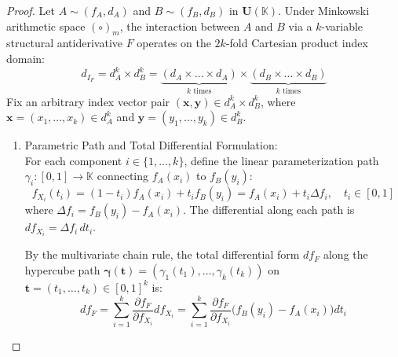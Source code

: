 \documentclass[a4paper,12pt,twoside]{memoir}
\begin{document}
	\begin{proof}
		Let $A \sim (f_A, d_A)$ and $B \sim (f_B, d_B)$ in $\mathbf{U}(\mathbb{K})$. Under Minkowski arithmetic space $(\circ)_m$, the interaction between $A$ and $B$ via a $k$-variable structural antiderivative $F$ operates on the $2k$-fold Cartesian product index domain:
		\[
		d_{I_F} = d_A^k \times d_B^k = \underbrace{(d_A \times \dots \times d_A)}_{k \text{ times}} \times \underbrace{(d_B \times \dots \times d_B)}_{k \text{ times}}
		\]
		Fix an arbitrary index vector pair $(\mathbf{x}, \mathbf{y}) \in d_A^k \times d_B^k$, where $\mathbf{x} = (x_1, \dots, x_k) \in d_A^k$ and $\mathbf{y} = (y_1, \dots, y_k) \in d_B^k$.
		
		\begin{enumerate}[leftmargin=*]
			\item Parametric Path and Total Differential Formulation: \\
			For each component $i \in \{1, \dots, k\}$, define the linear parameterization path $\gamma_i : [0, 1] \to \mathbb{K}$ connecting $f_A(x_i)$ to $f_B(y_i)$:
			\[
			f_{X_i}(t_i) = (1 - t_i) f_A(x_i) + t_i f_B(y_i) = f_A(x_i) + t_i \Delta f_i, \quad t_i \in [0, 1]
			\]
			where $\Delta f_i = f_B(y_i) - f_A(x_i)$. The differential along each path is $d f_{X_i} = \Delta f_i \, dt_i$.
			
			By the multivariate chain rule, the total differential form $df_F$ along the hypercube path $\boldsymbol{\gamma}(\mathbf{t}) = (\gamma_1(t_1), \dots, \gamma_k(t_k))$ on $\mathbf{t} = (t_1, \dots, t_k) \in [0, 1]^k$ is:
			\[
			d f_F = \sum_{i=1}^{k} \frac{\partial f_F}{\partial f_{X_i}} d f_{X_i} = \sum_{i=1}^{k} \frac{\partial f_F}{\partial f_{X_i}} \big(f_B(y_i) - f_A(x_i)\big) dt_i
			\]
			

\end{enumerate}
\end{proof}
\end{document}
